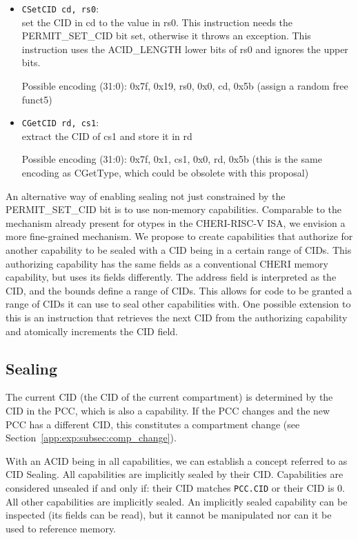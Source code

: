 \begin{itemize}
\item \texttt{CSetCID cd, rs0}:\\
set the CID in cd to the value in rs0.
This instruction needs the PERMIT\_SET\_CID bit set, otherwise it throws an exception.
This instruction uses the ACID\_LENGTH lower bits of rs0 and ignores the upper bits.

Possible encoding (31:0): 0x7f, 0x19, rs0, 0x0, cd, 0x5b (assign a random free funct5)

\item \texttt{CGetCID rd, cs1}:\\
extract the CID of cs1 and store it in rd

Possible encoding (31:0): 0x7f, 0x1, cs1, 0x0, rd, 0x5b (this is the same encoding as CGetType, which could be obsolete with this proposal)
\end{itemize}

An alternative way of enabling sealing not just constrained by the PERMIT\_SET\_CID bit is to use non-memory capabilities.
Comparable to the mechanism already present for otypes in the CHERI-RISC-V ISA, we envision a more fine-grained mechanism.
We propose to create capabilities that authorize for another capability to be sealed with a CID being in a certain range of CIDs.
This authorizing capability has the same fields as a conventional CHERI memory capability, but uses its fields differently.
The address field is interpreted as the CID, and the bounds define a range of CIDs.
This allows for code to be granted a range of CIDs it can use to seal other capabilities with.
One possible extension to this is an instruction that retrieves the next CID from the authorizing capability and atomically increments the CID field.


\subsection{Sealing}

The current CID (the CID of the current compartment) is determined by the CID in the PCC, which is also a capability.
If the PCC changes and the new PCC has a different CID, this constitutes a compartment change (see Section~\ref{app:exp:subsec:comp_change}).

With an ACID being in all capabilities, we can establish a concept referred to as CID Sealing.
All capabilities are implicitly sealed by their CID.
Capabilities are considered unsealed if and only if: their CID matches \texttt{PCC.CID} or their CID is 0. All other capabilities are implicitly sealed.
An implicitly sealed capability can be inspected (its fields can be read), but it cannot be manipulated nor can it be used to reference memory.


